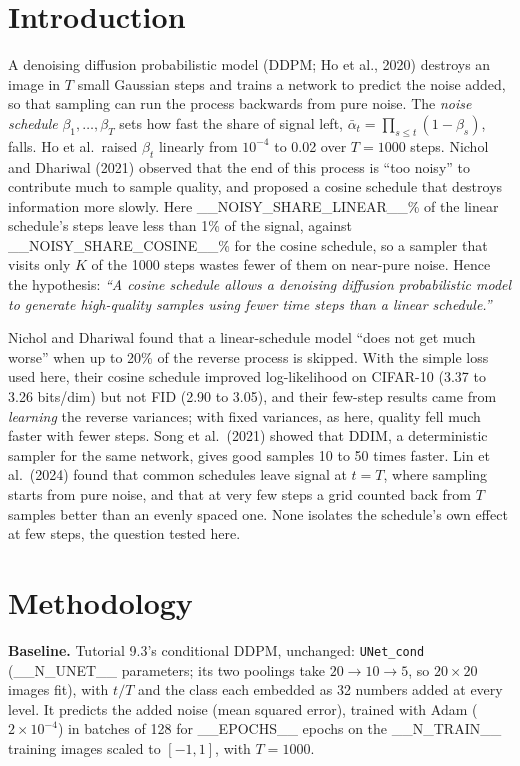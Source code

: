 \documentclass[10pt,a4paper,twocolumn]{article}
\begin{document}
\section{Introduction}
A denoising diffusion probabilistic model (DDPM; Ho et al., 2020) destroys an image in $T$ small
Gaussian steps and trains a network to predict the noise added, so that sampling can run the
process backwards from pure noise. The \emph{noise schedule} $\beta_1, \dots, \beta_T$ sets how
fast the share of signal left, $\bar\alpha_t = \prod_{s \le t}(1 - \beta_s)$, falls. Ho et al.\
raised $\beta_t$ linearly from $10^{-4}$ to 0.02 over $T = 1000$ steps. Nichol and Dhariwal (2021)
observed that the end of this process is ``too noisy'' to contribute much to sample quality, and
proposed a cosine schedule that destroys information more slowly. Here __NOISY_SHARE_LINEAR__\% of
the linear schedule's steps leave less than 1\% of the signal, against __NOISY_SHARE_COSINE__\% for
the cosine schedule, so a sampler that visits only $K$ of the 1000 steps wastes fewer of them on
near-pure noise. Hence the hypothesis: \emph{``A cosine schedule allows a denoising diffusion
probabilistic model to generate high-quality samples using fewer time steps than a linear
schedule.''}

Nichol and Dhariwal found that a linear-schedule model
``does not get much worse'' when up to 20\% of the reverse process is skipped. With the simple
loss used here, their cosine schedule improved log-likelihood on CIFAR-10 (3.37 to 3.26 bits/dim)
but not FID (2.90 to 3.05), and their few-step results came from \emph{learning} the
reverse variances; with fixed variances, as here, quality fell much faster with fewer steps.
Song et al.\ (2021) showed that DDIM, a deterministic sampler for the same network, gives
good samples 10 to 50 times faster. Lin et al.\ (2024) found that common schedules leave
signal at $t = T$, where sampling starts from pure noise, and that at very few steps a grid counted
back from $T$ samples better than an evenly spaced one. None isolates the schedule's own effect
at few steps, the question tested here.

\section{Methodology}
\textbf{Baseline.} Tutorial 9.3's conditional DDPM, unchanged: \texttt{UNet\_cond} (__N_UNET__
parameters; its two poolings take $20 \to 10 \to 5$, so $20\times20$ images fit), with $t/T$ and
the class each embedded as 32 numbers added at every level. It predicts the added noise (mean
squared error), trained with Adam ($2\times10^{-4}$) in batches of 128 for __EPOCHS__ epochs on
the __N_TRAIN__ training images scaled to $[-1, 1]$, with $T = 1000$.
\end{document}
